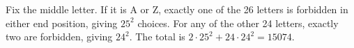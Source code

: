 Fix the middle letter. If it is A or Z, exactly one of the 26 letters is forbidden in either end position, giving $25^2$ choices. For any of the other 24 letters, exactly two are forbidden, giving $24^2$. The total is $2\cdot25^2+24\cdot24^2=\boxed{15074}$.
